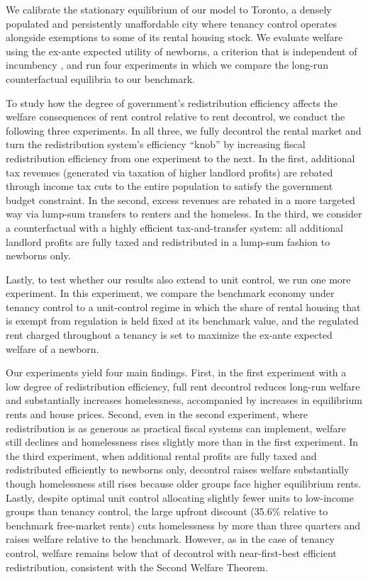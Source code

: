 \documentclass[parskip=full]{article}
\begin{document}
We calibrate the stationary equilibrium of our model to Toronto, a densely populated and persistently unaffordable city where tenancy control operates alongside exemptions to some of its rental housing stock. We evaluate welfare using the ex-ante expected utility of newborns, a criterion that is independent of incumbency \citep{rawls-1971,conesa-et-al,gkkoc}, and run four experiments in which we compare the long-run counterfactual equilibria to our benchmark. 

To study how the degree of government's redistribution efficiency affects the welfare consequences of rent control relative to rent decontrol, we conduct the following three experiments. In all three, we fully decontrol the rental market and turn the redistribution system’s efficiency ``knob'' by increasing fiscal redistribution efficiency from one experiment to the next. In the first, additional tax revenues (generated via taxation of higher landlord profits) are rebated through income tax cuts to the entire population to satisfy the government budget constraint. In the second, excess revenues are rebated in a more targeted way via lump-sum transfers to renters and the homeless. In the third, we consider a counterfactual with a highly efficient tax-and-transfer system: all additional landlord profits are fully taxed and redistributed in a lump-sum fashion to newborns only. 

Lastly, to test whether our results also extend to unit control, we run one more experiment. In this experiment, we compare the benchmark economy under tenancy control to a unit-control regime in which the share of rental housing that is exempt from regulation is held fixed at its benchmark value, and the regulated rent charged throughout a tenancy is set to maximize the ex-ante expected welfare of a newborn.

Our experiments yield four main findings. First, in the first experiment with a low degree of redistribution efficiency, full rent decontrol reduces long-run welfare and substantially increases homelessness, accompanied by increases in equilibrium rents and house prices. Second, even in the second experiment, where redistribution is as generous as practical fiscal systems can implement, welfare still declines and homelessness rises slightly more than in the first experiment. In the third experiment, when additional rental profits are fully taxed and redistributed efficiently to newborns only, decontrol raises welfare substantially though homelessness still rises because older groups face higher equilibrium rents. Lastly, despite optimal unit control allocating slightly fewer units to low-income groups than tenancy control, the large upfront discount (35.6\% relative to benchmark free-market rents) cuts homelessness by more than three quarters and raises welfare relative to the benchmark. However, as in the case of tenancy control, welfare remains below that of decontrol with near-first-best efficient redistribution, consistent with the Second Welfare Theorem.
\end{document}

